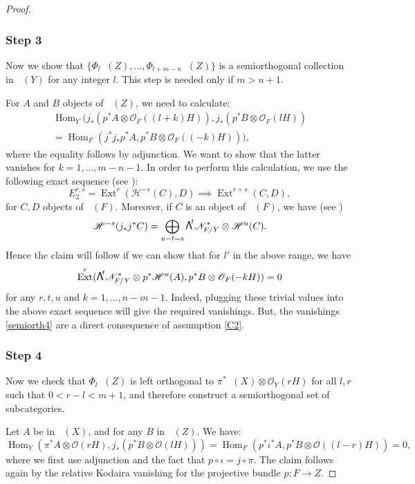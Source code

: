 \documentclass[JEP,XML,SOM,Unicode,NoEqCountersInSection]{cedram}
\newcommand\bw[1]{{\hbox{\large$\mathsf{\Lambda}$}^{\!#1}}}
\let\mathcal\mathscr
\theoremstyle{plain}
\theoremstyle{definition}
\newcommand{\cat}[1]{\mathsf{#1}}
\DeclareMathOperator{\Db}{{\cat{D}^{\mathrm{b}}}}
\DeclareMathOperator{\Hom}{Hom}
\DeclareMathOperator{\Ext}{Ext}
\newcommand{\sheaf}[1]{\mathcal{#1}}
\newcommand{\kh}{\sheaf{H}}
\newcommand{\kn}{\sheaf{N}}
\newcommand{\ko}{\sheaf{O}}\let\OO\ko\let\cO\ko
\begin{document}
\begin{proof}
\subsubsection*{Step 3}
Now we show that $\{\Phi_l \Db(Z),\ldots,\Phi_{l+m-n}\Db(Z) \}$ is a semiorthogonal collection in $\Db(Y)$
for any integer $l$. This step is needed only if $m > n+1$.

For $A$ and $B$ objects of $\Db(Z)$, we need to calculate:\vspace*{-3pt}
\begin{multline*}\label{eq:want-to-vanish1}
\Hom_Y(j_*(p^* A \otimes \ko_F((l+k)H)), j_*(p^* B \otimes \ko_F(lH))\\
=\Hom_F(j^* j_* p^* A, p^* B \otimes \ko_F((-k)H))),
\end{multline*}
where the equality follows by adjunction. We want to show that the latter vanishes
for $k=1, \ldots, m-n-1$.
In order to perform this calculation, we use the following exact
sequence (see \cite[Rem.\,3.7]{Huybook}):\vspace*{-3pt}
\[
E_2^{r,s} = \Ext^r (\kh^{-s}(C),D) \implies \Ext^{r+s}(C,D),
\]
for $C,D$ objects of $\Db(F)$.
Moreover, if $C$ is an object of $\Db(F)$, we have (see \cite[Cor.\,11.2]{Huybook})\vspace*{-3pt}
\[
\kh^{-s} (j_* j^* C) = \bigoplus_{u-t=s} \bw{t} \kn_{F/Y}^* \otimes \kh^u(C).
\]
Hence the claim will follow if we can show that for $l'$ in the above range, we have
\begin{equation}\label{semiorth4}
\Ext^r(\bw{t} \kn_{F/Y}^* \otimes p^* \kh^u (A),p^* B \otimes \ko_F(-kH))=0
\end{equation}
for any $r,t,u$ and $k=1,\ldots,n-m-1$. Indeed, plugging these trivial values into the above
exact sequence will give the required vanishings. But, the vanishings \eqref{semiorth4} are
a direct consequence of assumption \eqref{C2}.

\subsubsection*{Step 4}
Now we check that $\Phi_l \Db(Z)$ is left orthogonal to $\pi^* \Db(X) \otimes \ko_Y(rH)$ for all
$l,r$ such that $0 < r-l < m+1$, and therefore construct a semiorthogonal set of subcategories.

Let $A$ be in $\Db(X)$,
and for any $B$ in $\Db(Z)$. We have:
\begin{equation*}\label{eq:2nd-orthogonality}
\Hom_Y(\pi^* A \otimes \ko(rH),j_* (p^*B \otimes \ko(lH)))= \Hom_F(p^* \iota^* A , p^*B \otimes \ko((l-r)H))= 0,
\end{equation*}
where we first use adjunction and the fact that $p \circ \iota = j \circ \pi$.
The claim follows again by the relative Kodaira vanishing for
the projective bundle $p: F \to Z$.


\end{proof}
\end{document}
